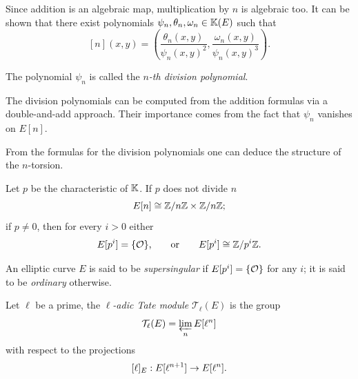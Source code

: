 Since addition is an algebraic map, multiplication by $n$ is algebraic
too. It can be shown that there exist polynomials
$\psi_n,\theta_n,\omega_n\in\mathbb{K}(E)$ such that
\begin{equation}
  \label{eq:124}
  [n](x,y) = \left(\frac{\theta_n(x,y)}{\psi_n(x,y)^2},
    \frac{\omega_n(x,y)}{\psi_n(x,y)^3}\right)
  \text{.}
\end{equation}

\begin{definition}
  The polynomial $\psi_n$ is called the
  \emph{$n$-th division polynomial}.
\end{definition}

\begin{remark}
  The division polynomials can be computed from the addition formulas
  via a double-and-add approach. Their importance comes from the fact
  that $\psi_n$ vanishes on $E[n]$.
\end{remark}

From the formulas for the division polynomials one can deduce the
structure of the $n$-torsion.

\begin{theorem}
  Let $p$ be the characteristic of $\mathbb{K}$. If $p$ does not divide $n$
  \begin{equation}
    \label{eq:126}
    E[n] \cong \mathbb{Z}/n\mathbb{Z}\times\mathbb{Z}/n\mathbb{Z}
    \text{;}
  \end{equation}
  if $p\ne0$, then for every $i>0$ either
  \begin{equation}
    \label{eq:127}
    E[p^i] = \{\mathcal{O}\}\text{,} 
    \qquad\text{or}\qquad E[p^i] \cong \mathbb{Z}/p^i\mathbb{Z}
    \text{.}
  \end{equation}
\end{theorem}

\begin{definition}
  An elliptic curve $E$ is said to be
  \emph{supersingular}
  if $E[p^i]=\{\mathcal{O}\}$ for any $i$; it is said to be
  \emph{ordinary} otherwise.
\end{definition}

\begin{definition}
  Let $\ell$ be a prime, the \emph{$\ell$-adic Tate
    module}
  $\mathcal{T}_\ell(E)$ is the group
  \begin{equation}
    \label{eq:132}
    \mathcal{T}_\ell(E) = \varprojlim_n E[\ell^n]
  \end{equation}
  with respect to the projections
  \begin{equation}
    \label{eq:133}
    [\ell]_E : E[\ell^{n+1}] \rightarrow E[\ell^{n}]
    \text{.}
  \end{equation}
\end{definition}

